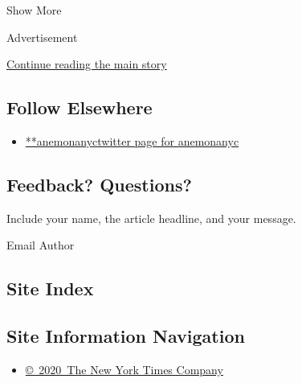 Show More

Advertisement

\protect\hyperlink{after-mid2}{Continue reading the main story}

\hypertarget{follow-elsewhere}{%
\subsection{Follow Elsewhere}\label{follow-elsewhere}}

\begin{itemize}
\tightlist
\item
  \href{https://twitter.com/anemonanyc}{**anemonanyctwitter page for
  anemonanyc}
\end{itemize}

\hypertarget{feedback-questions}{%
\subsection{Feedback? Questions?}\label{feedback-questions}}

Include your name, the article headline, and your message.

Email Author

\hypertarget{site-index}{%
\subsection{Site Index}\label{site-index}}

\hypertarget{site-information-navigation}{%
\subsection{Site Information
Navigation}\label{site-information-navigation}}

\begin{itemize}
\tightlist
\item
  \href{https://help.nytimes3xbfgragh.onion/hc/en-us/articles/115014792127-Copyright-notice}{©~2020~The
  New York Times Company}
\end{itemize}

